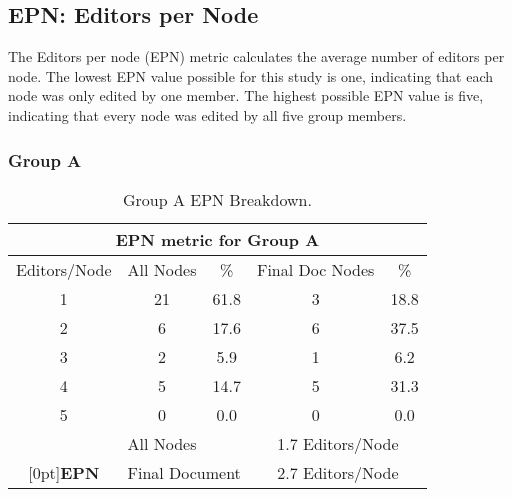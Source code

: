 %
%
%


\subsection{EPN: Editors per Node}

The Editors per node (EPN) metric calculates the average number of editors
per node.  The lowest EPN value possible for this study is one, indicating
that each node was only edited by one member.  The highest possible EPN
value is five, indicating that every node was edited by all five group
members.

\subsubsection{Group A}

\small
\begin{table}[htbp]
  \caption{Group A EPN Breakdown.}
  \begin{center}
    \begin{tabular}{|c|c|c|c|c|}
      \hline
      \multicolumn{5}{|c|}{\rule[-3mm]{0mm}{8mm}\bf EPN metric for Group A}\\ \hline
      Editors/Node&All Nodes&\%&Final Doc Nodes&\%\\ \hline
      \hline
      1&21&61.8&3&18.8\\ \hline
      2&6&17.6&6&37.5\\ \hline
      3&2&5.9&1&6.2\\ \hline
      4&5&14.7&5&31.3\\\hline 
      5&0&0.0&0&0.0\\\hline 
      \hline
      &\multicolumn{2}{|l|}{All Nodes}&\multicolumn{2}{|c|}{1.7
      Editors/Node}\\ \cline{2-5} 
      \raisebox{1.5ex}[0pt]{\bf EPN}&\multicolumn{2}{|l|}{Final
      Document}&\multicolumn{2}{|c|}{2.7 Editors/Node}\\\hline
    \end{tabular}
  \end{center}
  \label{tab:A-editing}
\end{table}
\normalsize

